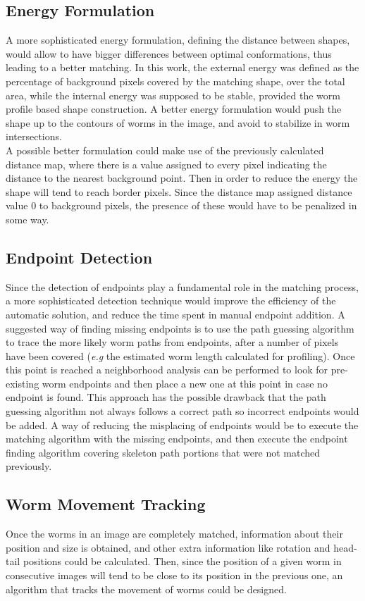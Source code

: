 \subsection*{Energy Formulation}
A more sophisticated energy formulation, defining the distance between 
shapes, would allow to have bigger differences between optimal conformations,
thus leading to a better matching. In this work, the external energy was
defined as the percentage of background pixels covered by the matching shape,
over the total area, while the internal energy was supposed to be stable,
provided the worm profile based shape construction. 
A better energy formulation would push the shape up to the contours of
worms in the image, and avoid to stabilize in worm intersections.\\
A possible better formulation could make use of the previously calculated
distance map, where there is a value assigned to every pixel
indicating the distance to the nearest background point. 
Then in order to reduce the energy the shape will tend to reach border pixels.
Since the distance map assigned distance value $0$ to background pixels, the 
presence of these would have to be penalized in some way.


\subsection*{Endpoint Detection}
Since the detection of endpoints play a fundamental role in the matching 
process, a more sophisticated detection technique would improve the 
efficiency of the automatic solution, and reduce the time spent in
manual endpoint addition. A suggested way of finding missing endpoints is
to use the path guessing algorithm to trace the more likely worm paths 
from endpoints, after a number of pixels have been covered (\emph{e.g} the
estimated worm length calculated for profiling). Once this point is reached
a neighborhood analysis can be performed to look for pre-existing 
worm endpoints and then place a new one at this point in case no endpoint 
is found. This approach has the possible drawback that the path guessing
algorithm not always follows a correct path so incorrect endpoints would
be added. A way of reducing the misplacing of endpoints would be to execute
the matching algorithm with the missing endpoints, and then execute the 
endpoint finding algorithm covering skeleton path portions that were not 
matched previously.

\subsection*{Worm Movement Tracking}
Once the worms in an image are completely matched, information about their
position and size is obtained, and other extra information like rotation
and head-tail positions could be calculated. Then, since the position of 
a given worm in consecutive images will tend to be close to its position in
the previous one, an algorithm that tracks the movement of worms could be 
designed. 
